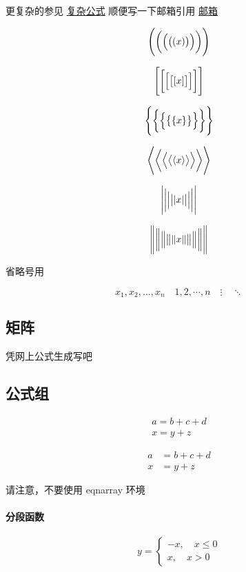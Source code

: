 \documentclass[UTF8]{ctexart}
\begin{document}
	更复杂的参见 \href{https://liam.page/2018/11/09/the-bigger-than-bigger-delimiter-in-LaTeX/}{复杂公式}
	顺便写一下邮箱引用	\href{mailto: 1327905168@qq.com}{邮箱}
	
	\[ \Biggl(\biggl(\Bigl(\bigl((x)\bigr)\Bigr)\biggr)\Biggr) \]
	
	\[ \Biggl[\biggl[\Bigl[\bigl[[x]\bigr]\Bigr]\biggr]\Biggr] \]
	
	\[ \Biggl \{\biggl \{\Bigl \{\bigl \{\{x\}\bigr \}\Bigr \}\biggr \}\Biggr\} \]
	
	\[ \Biggl\langle\biggl\langle\Bigl\langle\bigl\langle\langle x
	\rangle\bigr\rangle\Bigr\rangle\biggr\rangle\Biggr\rangle \]
	
	\[ \Biggl\lvert\biggl\lvert\Bigl\lvert\bigl\lvert\lvert x
	\rvert\bigr\rvert\Bigr\rvert\biggr\rvert\Biggr\rvert \]
	
	\[ \Biggl\lVert\biggl\lVert\Bigl\lVert\bigl\lVert\lVert x
	\rVert\bigr\rVert\Bigr\rVert\biggr\rVert\Biggr\rVert \]
	
	省略号用
	
	\[ x_1,x_2,\dots ,x_n\quad 1,2,\cdots ,n\quad \vdots\quad \ddots \]
	
	\subsection{矩阵}
	凭网上公式生成写吧
	
	\subsection{公式组}
	
	\begin{gather}
	a = b+c+d \\
	x = y+z
	\end{gather}
	
	\begin{align}
	a &= b+c+d \\
	x &= y+z
	\end{align}
	
	
	请注意，不要使用 eqnarray 环境
	
	\paragraph{分段函数}
	\[ y= \begin{cases}
	-x,\quad x\leq 0 \\
	x,\quad x>0
	\end{cases} \]
	
\end{document}
